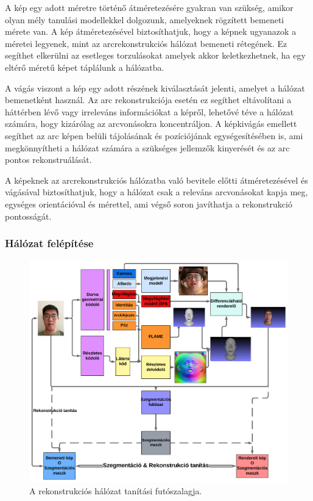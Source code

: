 \documentclass[12pt,a4]{article}
\begin{document}
            A kép egy adott méretre történő átméretezésére gyakran van szükség, amikor olyan mély tanulási modellekkel dolgozunk, amelyeknek rögzített bemeneti mérete van. A kép átméretezésével biztosíthatjuk, hogy a képnek ugyanazok a méretei legyenek, mint az arcrekonstrukciós hálózat bemeneti rétegének. Ez segíthet elkerülni az esetleges torzulásokat amelyek akkor keletkezhetnek, ha egy eltérő méretű képet táplálunk a hálózatba.

            A vágás viszont a kép egy adott részének kiválasztását jelenti, amelyet a hálózat bemenetként használ. Az arc rekonstrukciója esetén ez segíthet eltávolítani a háttérben lévő vagy irreleváns információkat a képről, lehetővé téve a hálózat számára, hogy kizárólag az arcvonásokra koncentráljon. A képkivágás emellett segíthet az arc képen belüli tájolásának és pozíciójának egységesítésében is, ami megkönnyítheti a hálózat számára a szükséges jellemzők kinyerését és az arc pontos rekonstruálását.

            A képeknek az arcrekonstrukciós hálózatba való bevitele előtti átméretezésével és vágásával biztosíthatjuk, hogy a hálózat csak a releváns arcvonásokat kapja meg, egységes orientációval és mérettel, ami végső soron javíthatja a rekonstrukció pontosságát.
            
            \subsubsection{Hálózat felépítése}

            \begin{figure}[h!]	
        		\centering
        		\includegraphics[width=1\linewidth]{pipelinehun}
        		\caption{  A rekonstrukciós hálózat tanítási futószalagja.}
                \label{fig:pipeline}
        	\end{figure}
\end{document}
